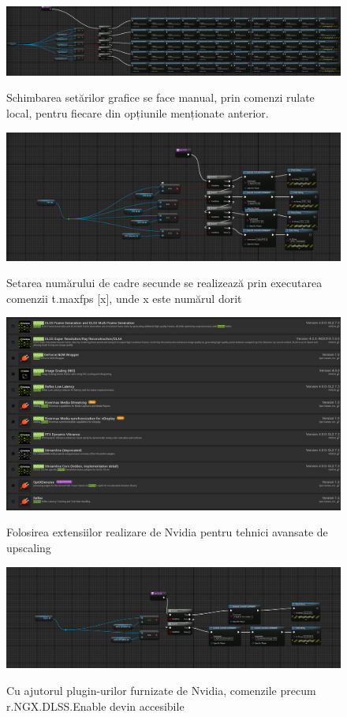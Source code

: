 \begin{figure} [htp] 
\centering 
\includegraphics [width=14cm]
{continut/capitol3/figuri/Graphics.png} 
\label{fig:Menu}  
    \caption{Schimbarea setărilor grafice se face manual, prin comenzi rulate local, pentru fiecare din opțiunile menționate anterior.}
\end{figure} 
\begin{figure} [htp] 
\centering 
\includegraphics [width=14cm]
{continut/capitol3/figuri/FPS.png} 
\label{fig:Menu}  
    \caption{Setarea numărului de cadre secunde se realizează prin executarea comenzii t.maxfps [x], unde x este numărul dorit}
\end{figure}
\begin{figure} [htp] 
\centering 
\includegraphics [width=14cm]
{continut/capitol3/figuri/NvidiaPlugin.png} 
\label{fig:Menu}  
    \caption{Folosirea extensiilor realizare de Nvidia pentru tehnici avansate de upscaling}
\end{figure}
\begin{figure} [htp] 
\centering 
\includegraphics [width=14cm]
{continut/capitol3/figuri/DLSS.png} 
\label{fig:Menu}  
    \caption{Cu ajutorul plugin-urilor furnizate de Nvidia, comenzile precum r.NGX.DLSS.Enable devin accesibile}
\end{figure}
